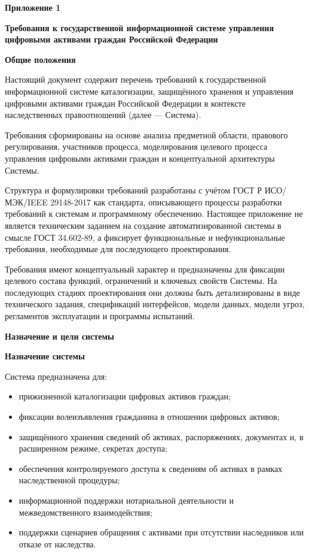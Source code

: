 \newpage
\begin{flushright}
\textbf{Приложение 1}
\end{flushright}

\begin{center}
\textbf{\large Требования к государственной информационной системе управления цифровыми активами граждан Российской Федерации}
\end{center}


\textbf{Общие положения}

Настоящий документ содержит перечень требований к государственной информационной системе каталогизации, защищённого хранения и управления цифровыми активами граждан Российской Федерации в контексте наследственных правоотношений (далее --- Система).

Требования сформированы на основе анализа предметной области, правового регулирования, участников процесса, моделирования целевого процесса управления цифровыми активами граждан и концептуальной архитектуры Системы.

Структура и формулировки требований разработаны с учётом ГОСТ Р ИСО/МЭК/IEEE 29148-2017 как стандарта, описывающего процессы разработки требований к системам и программному обеспечению. Настоящее приложение не является техническим заданием на создание автоматизированной системы в смысле ГОСТ 34.602-89, а фиксирует функциональные и нефункциональные требования, необходимые для последующего проектирования.

Требования имеют концептуальный характер и предназначены для фиксации целевого состава функций, ограничений и ключевых свойств Системы. На последующих стадиях проектирования они должны быть детализированы в виде технического задания, спецификаций интерфейсов, модели данных, модели угроз, регламентов эксплуатации и программы испытаний.

\textbf{Назначение и цели системы}

\textbf{Назначение системы}

Система предназначена для:
\begin{itemize}
    \item прижизненной каталогизации цифровых активов граждан;
    \item фиксации волеизъявления гражданина в отношении цифровых активов;
    \item защищённого хранения сведений об активах, распоряжениях, документах и, в расширенном режиме, секретах доступа;
    \item обеспечения контролируемого доступа к сведениям об активах в рамках наследственной процедуры;
    \item информационной поддержки нотариальной деятельности и межведомственного взаимодействия;
    \item поддержки сценариев обращения с активами при отсутствии наследников или отказе от наследства.
\end{itemize}

